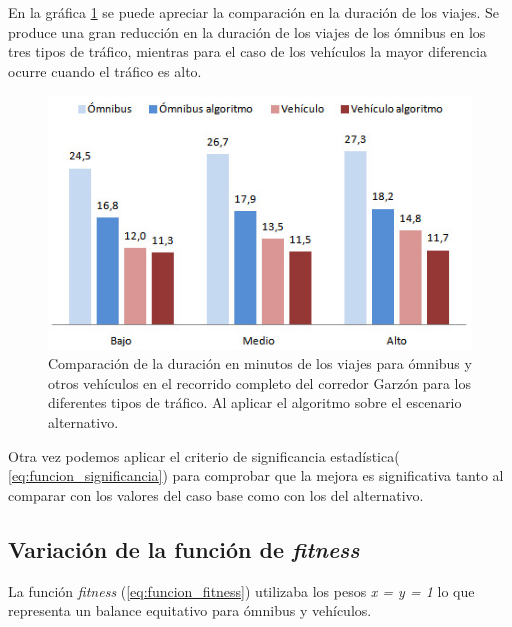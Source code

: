 En la gráfica \ref{fig:duracion_viajes_alernativo} se puede apreciar la comparación en la duración de los viajes. Se produce una gran reducción en la duración de los viajes de los ómnibus en los tres tipos de tráfico, mientras para el caso de los vehículos la mayor diferencia ocurre cuando el tráfico es alto.

\begin{figure}[H]
	\centering
	\includegraphics[width=0.8\linewidth]{Figures/duracio_viajes_alternativo}
	\caption{Comparación de la duración en minutos de los viajes para ómnibus y otros vehículos en el recorrido completo del corredor Garzón para los diferentes tipos de tráfico. Al aplicar el algoritmo sobre el escenario alternativo.}
	\label{fig:duracion_viajes_alernativo}
\end{figure}

Otra vez podemos aplicar el criterio de significancia estadística( \ref{eq:funcion_significancia}) para comprobar que la mejora es significativa tanto al comparar con los valores del caso base como con los del alternativo.

\subsection{Variación de la función de \emph{fitness}}

La función \emph{fitness} (\ref{eq:funcion_fitness}) utilizaba los pesos \emph{x = y = 1} lo que representa un balance equitativo  para ómnibus y vehículos.


